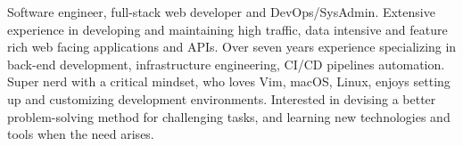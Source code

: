 

\begin{cvparagraph}
Software engineer, full-stack web developer and DevOps/SysAdmin.
Extensive experience in developing and maintaining high traffic, data intensive and feature rich web facing applications and APIs.
Over seven years experience specializing in back-end development, infrastructure engineering, CI/CD pipelines automation.
Super nerd with a critical mindset, who loves Vim, macOS, Linux, enjoys setting up and customizing development environments.
Interested in devising a better problem-solving method for challenging tasks, and learning new technologies and tools when the need arises.
\end{cvparagraph}
